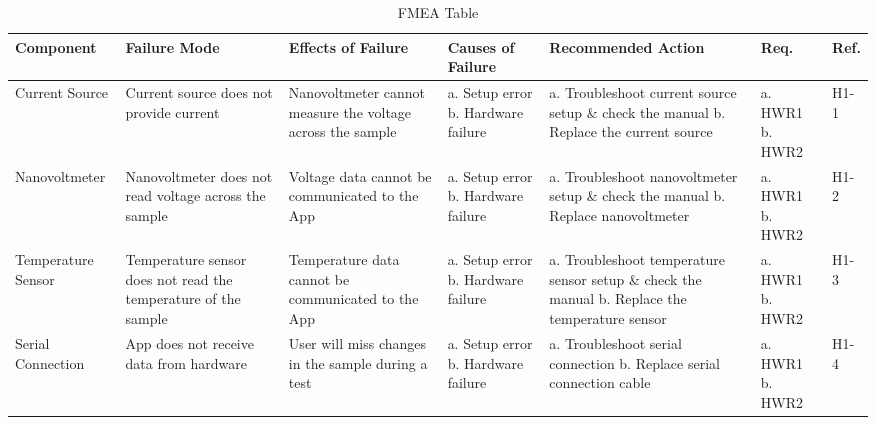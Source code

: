 \documentclass{article}
\begin{document}
\begin{landscape}
\begin{table}[h]
  \centering
  \caption{FMEA Table}
  \label{my-label}
  \begin{tabular}{|P{20mm}|P{30mm}|P{30mm}|P{30mm}|P{35mm}|P{20mm}|P{10mm}|}
    \hline
    \textbf{Component} & \textbf{Failure Mode} & \textbf{Effects of Failure} & \textbf{Causes of Failure} & \textbf{Recommended Action} & \textbf{Req.} & \textbf{Ref.}      \\ \hline
    Current Source
    & Current source does not provide current 
    & Nanovoltmeter cannot measure the voltage across the sample
    & a. Setup error \newline
      b. Hardware failure
    & a. Troubleshoot current source setup \& check the manual \newline
      b. Replace the current source
    & a. HWR1 \newline
      b. HWR2
    & H1-1      \\ \hline
    Nanovoltmeter
    & Nanovoltmeter does not read voltage across the sample
    & Voltage data cannot be communicated to the App
    & a. Setup error \newline
      b. Hardware failure
    & a. Troubleshoot nanovoltmeter setup \& check the manual \newline
      b. Replace nanovoltmeter
    & a. HWR1 \newline
      b. HWR2
    & H1-2      \\ \hline
    Temperature Sensor
    & Temperature sensor does not read the temperature of the sample
    & Temperature data cannot be communicated to the App
    & a. Setup error \newline
      b. Hardware failure
    & a. Troubleshoot temperature sensor setup \& check the manual \newline
      b. Replace the temperature sensor 
    & a. HWR1 \newline
      b. HWR2
    & H1-3    \\ \hline
    Serial Connection
    & App does not receive data from hardware
    & User will miss changes in the sample during a test
    & a. Setup error \newline
      b. Hardware failure
    & a. Troubleshoot serial connection \newline
      b. Replace serial connection cable
    & a. HWR1 \newline
      b. HWR2
    & H1-4      \\ \hline

\end{tabular}
\end{table}
\end{landscape}
\end{document}
